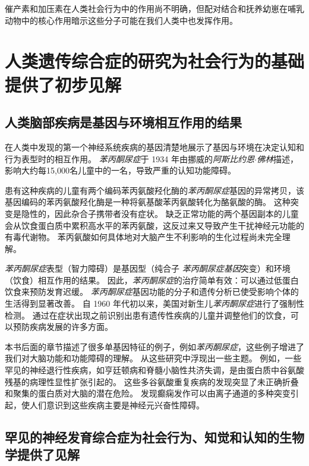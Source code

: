 催产素和加压素在人类社会行为中的作用尚不明确，但配对结合和抚养幼崽在哺乳动物中的核心作用暗示这些分子可能在我们人类中也发挥作用。



\section{人类遗传综合症的研究为社会行为的基础提供了初步见解}

\subsection{人类脑部疾病是基因与环境相互作用的结果}

在人类中发现的第一个神经系统疾病的基因清楚地展示了基因与环境在决定认知和行为表型时的相互作用。
\textit{苯丙酮尿症}于 1934 年由挪威的\textit{阿斯比约恩$\cdot$佛林}描述，影响大约每15,000名儿童中的一名，导致严重的认知功能障碍。


患有这种疾病的儿童有两个编码苯丙氨酸羟化酶的\textit{苯丙酮尿症}基因的异常拷贝，该基因编码的苯丙氨酸羟化酶是一种将氨基酸苯丙氨酸转化为酪氨酸的酶。
这种突变是隐性的，因此杂合子携带者没有症状。
缺乏正常功能的两个基因副本的儿童会从饮食蛋白质中累积高水平的苯丙氨酸，这反过来又导致产生干扰神经元功能的有毒代谢物。
苯丙氨酸如何具体地对大脑产生不利影响的生化过程尚未完全理解。



\textit{苯丙酮尿症}表型（智力障碍）是基因型（纯合子 \textit{苯丙酮尿症基因}突变）和环境（饮食）相互作用的结果。
因此，\textit{苯丙酮尿症}的治疗简单有效：可以通过低蛋白饮食来预防发育迟缓。
\textit{苯丙酮尿症}基因功能的分子和遗传分析已使受影响个体的生活得到显著改善。
自 1960 年代初以来，美国对新生儿\textit{苯丙酮尿症}进行了强制性检测。
通过在症状出现之前识别出患有遗传性疾病的儿童并调整他们的饮食，可以预防疾病发展的许多方面。



本书后面的章节描述了很多单基因特征的例子，例如\textit{苯丙酮尿症}，这些例子增进了我们对大脑功能和功能障碍的理解。
从这些研究中浮现出一些主题。
例如，一些罕见的神经退行性疾病，如亨廷顿病和脊髓小脑性共济失调，是由蛋白质中谷氨酸残基的病理性显性扩张引起的。
这些多谷氨酸重复疾病的发现突显了未正确折叠和聚集的蛋白质对大脑的潜在危险。
发现癫痫发作可以由离子通道的多种突变引起，使人们意识到这些疾病主要是神经元兴奋性障碍。



\subsection{罕见的神经发育综合症为社会行为、知觉和认知的生物学提供了见解}


